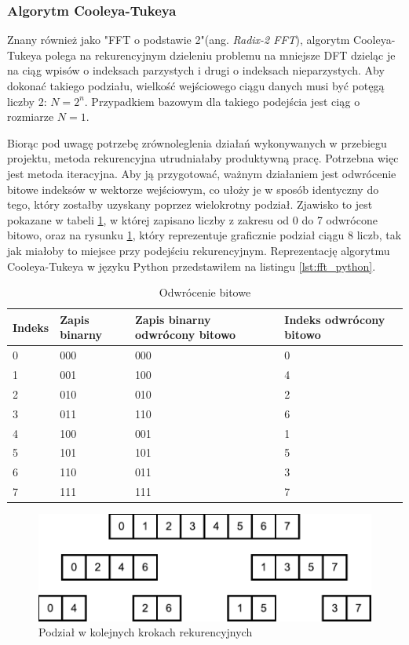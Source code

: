 \documentclass[a4paper,12pt]{book} %
\begin{document}
\subsubsection{Algorytm Cooleya-Tukeya}
Znany również jako "FFT o podstawie 2"(ang. \emph{Radix-2 FFT}), algorytm Cooleya-Tukeya polega na rekurencyjnym dzieleniu problemu na mniejsze DFT dzieląc je na ciąg wpisów o indeksach parzystych i drugi o indeksach nieparzystych.\cite{CooleyTukey} Aby dokonać takiego podziału, wielkość wejściowego ciągu danych musi być potęgą liczby 2: $N = 2^n.$ Przypadkiem bazowym dla takiego podejścia jest ciąg o rozmiarze $N = 1.$

Biorąc pod uwagę potrzebę zrównoleglenia działań wykonywanych w przebiegu projektu, metoda rekurencyjna utrudniałaby produktywną pracę. Potrzebna więc jest metoda iteracyjna. Aby ją przygotować, ważnym działaniem jest odwrócenie bitowe indeksów w wektorze wejściowym, co ułoży je w sposób identyczny do tego, który zostałby uzyskany poprzez wielokrotny podział. Zjawisko to jest pokazane w tabeli \ref{tab:bit_reversal}, w której zapisano liczby z zakresu od 0 do 7 odwrócone bitowo, oraz na rysunku \ref{fig:bit_reversal}, który reprezentuje graficznie podział ciągu 8 liczb, tak jak miałoby to miejsce przy podejściu rekurencyjnym. Reprezentację algorytmu Cooleya-Tukeya w języku Python przedstawiłem na listingu \ref{lst:fft_python}.

\begin{table}[H]
\begin{adjustbox}{max width=\textwidth}
\begin{tabular}{|l|l|l|l|}
\hline
Indeks & Zapis binarny & Zapis binarny odwrócony bitowo & Indeks odwrócony bitowo \\
\hline
0 & 000 & 000 & 0 \\
1 & 001 & 100 & 4 \\
2 & 010 & 010 & 2 \\
3 & 011 & 110 & 6 \\
4 & 100 & 001 & 1 \\
5 & 101 & 101 & 5 \\
6 & 110 & 011 & 3 \\
7 & 111 & 111 & 7 \\
\hline
\end{tabular}
\end{adjustbox}
\caption{Odwrócenie bitowe}
\label{tab:bit_reversal}
\end{table}
\begin{figure}[h]
	\centering
	\includegraphics[scale=0.7]{assets/bit_reversal.pdf}
	\caption{Podział w kolejnych krokach rekurencyjnych}
	\label{fig:bit_reversal}
\end{figure}
\end{document}
